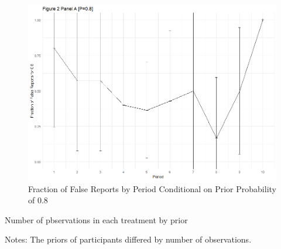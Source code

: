 \documentclass[12pt,a4paper]{article}
\begin{document}
	\begin{figure}
		\centering
		\includegraphics[scale=0.4]{../../results/2a_80.png}
		\caption{Fraction of False Reports by Period Conditional on Prior Probability of 0.8} \label{tab:F6}
		\label{fig:enter-label}
	\end{figure}
	
	
	\newpage
	
	\begin{table}[H]
		\centering
		\caption{Number of pbservations in each treatment by prior} \label{tab:table1}
		\begin{threeparttable}
			\footnotesize 
			 
			\begin{tablenotes}
				\scriptsize 
				\item{Notes: The priors of participants differed by number of observations.
				}
			\end{tablenotes}  
		\end{threeparttable}                          
	\end{table}
	
\end{document}
